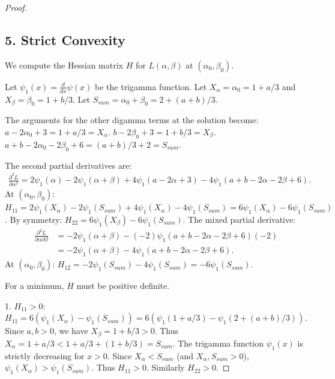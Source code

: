 \documentclass{article}
\theoremstyle{plain}
\theoremstyle{definition}
\theoremstyle{remark}
\begin{document}
\begin{proof}
\subsection*{5. Strict Convexity}
We compute the Hessian matrix $H$ for $L(\alpha,\beta)$ at $(\alpha_0, \beta_0)$. 

Let $\psi_1(x) = \frac{d}{dx}\psi(x)$ be the trigamma function. Let $X_\alpha = \alpha_0 = 1+a/3$ and $X_\beta = \beta_0 = 1+b/3$. Let $S_{sum} = \alpha_0+\beta_0 = 2+(a+b)/3$.

The arguments for the other digamma terms at the solution become:
$a-2\alpha_0+3 = 1+a/3 = X_\alpha$.
$b-2\beta_0+3 = 1+b/3 = X_\beta$.
$a+b-2\alpha_0-2\beta_0+6 = (a+b)/3+2 = S_{sum}$.

The second partial derivatives are:
\begin{align*} \frac{\partial^2 L}{\partial \alpha^2} = 2\psi_1(\alpha) - 2\psi_1(\alpha+\beta) + 4\psi_1(a-2\alpha+3) - 4\psi_1(a+b-2\alpha-2\beta+6). \end{align*}
At $(\alpha_0,\beta_0)$:
$H_{11} = 2\psi_1(X_\alpha) - 2\psi_1(S_{sum}) + 4\psi_1(X_\alpha) - 4\psi_1(S_{sum}) = 6\psi_1(X_\alpha) - 6\psi_1(S_{sum})$.
By symmetry:
$H_{22} = 6\psi_1(X_\beta) - 6\psi_1(S_{sum})$.
The mixed partial derivative:
\begin{align*} \frac{\partial^2 L}{\partial \alpha \partial \beta} &= -2\psi_1(\alpha+\beta) - (-2)\psi_1(a+b-2\alpha-2\beta+6)(-2) \\ &= -2\psi_1(\alpha+\beta) - 4\psi_1(a+b-2\alpha-2\beta+6). \end{align*}
At $(\alpha_0,\beta_0)$:
$H_{12} = -2\psi_1(S_{sum}) - 4\psi_1(S_{sum}) = -6\psi_1(S_{sum})$.

For a minimum, $H$ must be positive definite.

1. $H_{11} > 0$:
$H_{11} = 6(\psi_1(X_\alpha) - \psi_1(S_{sum})) = 6(\psi_1(1+a/3) - \psi_1(2+(a+b)/3))$.
Since $a,b>0$, we have $X_\beta = 1+b/3 > 0$. Thus $X_\alpha = 1+a/3 < 1+a/3 + (1+b/3) = S_{sum}$.
The trigamma function $\psi_1(x)$ is strictly decreasing for $x>0$. Since $X_\alpha < S_{sum}$ (and $X_\alpha, S_{sum} >0$), $\psi_1(X_\alpha) > \psi_1(S_{sum})$. Thus $H_{11} > 0$. Similarly $H_{22} > 0$.


\end{proof}
\end{document}
